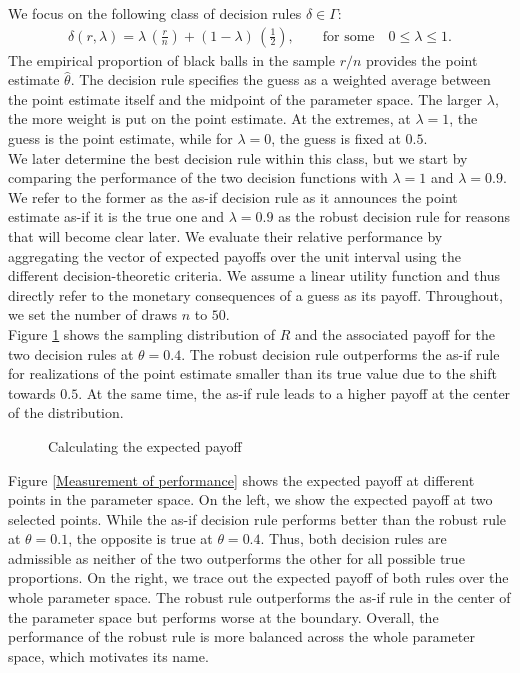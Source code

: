 We focus on the following class of decision rules $\delta \in \Gamma$:
%
\begin{align*}
 \delta(r, \lambda) = \lambda\,\left(\frac{r}{n}\right)  + (1 - \lambda)\,\left(\frac{1}{2}\right),\qquad\text{for some}\quad 0 \leq \lambda \leq 1.
\end{align*}
%
The empirical proportion of black balls in the sample $r / n$ provides the point estimate $\hat{\theta}$. The decision rule specifies the guess as a weighted average between the point estimate itself and the midpoint of the parameter space. The larger $\lambda$, the more weight is put on the point estimate. At the extremes, at $\lambda = 1$, the guess is the point estimate, while for $\lambda = 0$, the guess is fixed at $0.5$.\\

We later determine the best decision rule within this class, but we start by comparing the performance of the two decision functions with $\lambda = 1$ and $\lambda = 0.9$. We refer to the former as the as-if decision rule as it announces the point estimate as-if it is the true one and $\lambda=0.9$ as the robust decision rule for reasons that will become clear later. We evaluate their relative performance by aggregating the vector of expected payoffs over the unit interval using the different decision-theoretic criteria. We assume a linear utility function and thus directly refer to the monetary consequences of a guess as its payoff. Throughout, we set the number of draws $n$ to  $50$.\\

Figure \ref{Calculation of expected payoff} shows the sampling distribution of $R$ and the associated payoff for the two decision rules at $\theta = 0.4$. The robust decision rule outperforms the as-if rule for realizations of the point estimate smaller than its true value due to the shift towards $0.5$. At the same time, the as-if rule leads to a higher payoff at the center of the distribution.\\

\begin{figure}[h!]\centering
{}
\caption{Calculating the expected payoff}\label{Calculation of expected payoff}
\end{figure}\FloatBarrier

Figure \ref{Measurement of performance} shows the expected payoff at different points in the parameter space. On the left, we show the expected payoff at two selected points. While the as-if decision rule performs better than the robust rule at $\theta = 0.1$, the opposite is true at $\theta = 0.4$. Thus, both decision rules are admissible as neither of the two outperforms the other for all possible true proportions. On the right, we trace out the expected payoff of both rules over the whole parameter space. The robust rule outperforms the as-if rule in the center of the parameter space but performs worse at the boundary. Overall, the performance of the robust rule is more balanced across the whole parameter space, which motivates its name.

